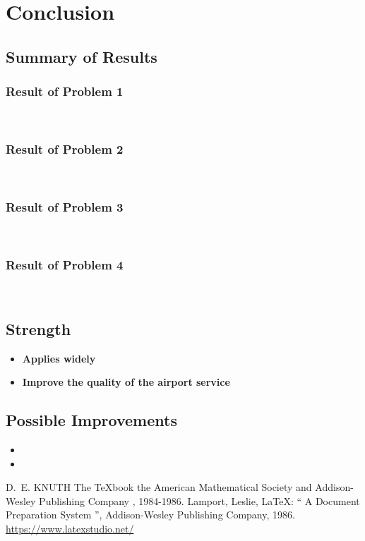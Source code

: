\documentclass{mcmthesis}
\begin{document}
\section{Conclusion}
\subsection{Summary of Results}
\subsubsection{Result of Problem 1}
\ 
\indent \lipsum[39]
\subsubsection{Result of Problem 2}
\ 
\indent \lipsum[40]
\subsubsection{Result of Problem 3}
\ 
\indent \lipsum[41]
\subsubsection{Result of Problem 4}
\ 
\indent \lipsum[42]
\subsection{Strength}
\begin{itemize}
	\item \textbf{Applies widely}\\
	\lipsum[43]
	\item \textbf{Improve the quality of the airport service}\\
	\lipsum[44]
\end{itemize}
\subsection{Possible Improvements}
\begin{itemize}
	\item
	\item
\end{itemize}

\begin{thebibliography}{99}
\bibitem{1} D.~E. KNUTH   The \TeX{}book  the American
Mathematical Society and Addison-Wesley
Publishing Company , 1984-1986.
\bibitem{2}Lamport, Leslie,  \LaTeX{}: `` A Document Preparation System '',
Addison-Wesley Publishing Company, 1986.
\bibitem{3}\url{https://www.latexstudio.net/}
\end{thebibliography}
\end{document}
